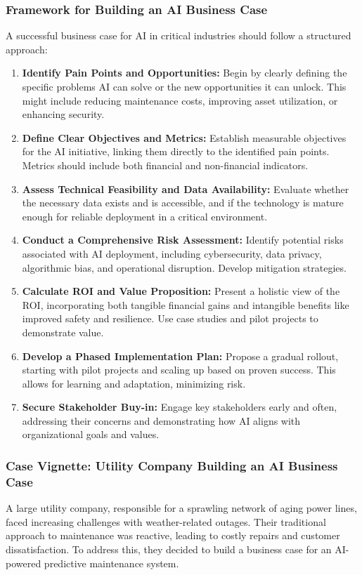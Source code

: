 \subsubsection{Framework for Building an AI Business Case}
A successful business case for AI in critical industries should follow a structured approach:
\begin{enumerate}
    \item \textbf{Identify Pain Points and Opportunities:} Begin by clearly defining the specific problems AI can solve or the new opportunities it can unlock. This might include reducing maintenance costs, improving asset utilization, or enhancing security.
    \item \textbf{Define Clear Objectives and Metrics:} Establish measurable objectives for the AI initiative, linking them directly to the identified pain points. Metrics should include both financial and non-financial indicators.
    \item \textbf{Assess Technical Feasibility and Data Availability:} Evaluate whether the necessary data exists and is accessible, and if the technology is mature enough for reliable deployment in a critical environment.
    \item \textbf{Conduct a Comprehensive Risk Assessment:} Identify potential risks associated with AI deployment, including cybersecurity, data privacy, algorithmic bias, and operational disruption. Develop mitigation strategies.
    \item \textbf{Calculate ROI and Value Proposition:} Present a holistic view of the ROI, incorporating both tangible financial gains and intangible benefits like improved safety and resilience. Use case studies and pilot projects to demonstrate value.
    \item \textbf{Develop a Phased Implementation Plan:} Propose a gradual rollout, starting with pilot projects and scaling up based on proven success. This allows for learning and adaptation, minimizing risk.
    \item \textbf{Secure Stakeholder Buy-in:} Engage key stakeholders early and often, addressing their concerns and demonstrating how AI aligns with organizational goals and values.
\end{enumerate}

\subsubsection{Case Vignette: Utility Company Building an AI Business Case}
A large utility company, responsible for a sprawling network of aging power lines, faced increasing challenges with weather-related outages. Their traditional approach to maintenance was reactive, leading to costly repairs and customer dissatisfaction. To address this, they decided to build a business case for an AI-powered predictive maintenance system.

